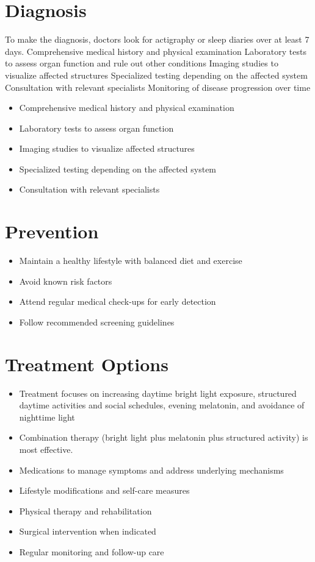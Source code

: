 \section{Diagnosis}
To make the diagnosis, doctors look for actigraphy or sleep diaries over at least 7 days. Comprehensive medical history and physical examination Laboratory tests to assess organ function and rule out other conditions Imaging studies to visualize affected structures Specialized testing depending on the affected system Consultation with relevant specialists Monitoring of disease progression over time

\begin{itemize}[noitemsep]
  \item Comprehensive medical history and physical examination
  \item Laboratory tests to assess organ function
  \item Imaging studies to visualize affected structures
  \item Specialized testing depending on the affected system
  \item Consultation with relevant specialists
\end{itemize}
\section{Prevention}
\begin{itemize}[noitemsep]
  \item Maintain a healthy lifestyle with balanced diet and exercise
  \item Avoid known risk factors
  \item Attend regular medical check-ups for early detection
  \item Follow recommended screening guidelines
\end{itemize}
\section{Treatment Options}
\begin{itemize}[noitemsep]
  \item Treatment focuses on increasing daytime bright light exposure, structured daytime activities and social schedules, evening melatonin, and avoidance of nighttime light
  \item Combination therapy (bright light plus melatonin plus structured activity) is most effective.
  \item Medications to manage symptoms and address underlying mechanisms
  \item Lifestyle modifications and self-care measures
  \item Physical therapy and rehabilitation
  \item Surgical intervention when indicated
  \item Regular monitoring and follow-up care
\end{itemize}
